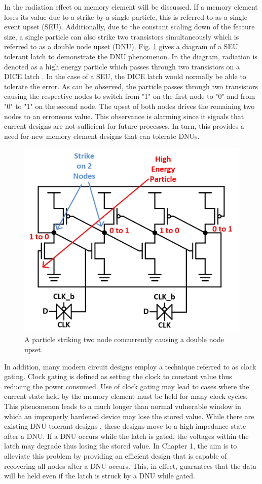In the radiation effect on memory element will be discussed. If a memory element loses its value due to a strike by a single particle, this is referred to as a single event upset (SEU). Additionally, due to the constant scaling down of the feature size, a single particle can also strike two transistors simultaneously which is referred to as a double node upset (DNU). Fig. \ref{DNUStrike} gives a diagram of a SEU tolerant latch to demonstrate the DNU phenomenon. In the diagram, radiation is denoted as a high energy particle which passes through two transistors on a DICE latch \cite{DICE}. In the case of a SEU, the DICE latch would normally be able to tolerate the error. As can be observed, the particle passes through two transistors causing the respective nodes to switch from "1" on the first node to "0" and from "0" to "1" on the second node. The upset of both nodes drives the remaining two nodes to an erroneous value. This observance is alarming since it signals that current designs are not sufficient for future processes. In turn, this provides a need for new memory element designs that can tolerate DNUs. 

\begin{figure}[!htbp]
	\centering
	\includegraphics[width=0.45\linewidth]{Figures/StrikeonDICE}
	\caption{A particle striking two node concurrently causing a double node upset.}
	\label{DNUStrike}
\end{figure} 

In addition, many modern circuit designs employ a technique referred to as clock gating. Clock gating is defined as setting the clock to constant value thus reducing the power consumed. Use of clock gating may lead to cases where the current state held by the memory element must be held for many clock cycles. This phenomenon leads to a much longer than normal vulnerable window in which an improperly hardened device may lose the stored value. While there are existing DNU tolerant designs \cite{Inter,DNCS,HSMUF}, these designs move to a high impedance state after a DNU. If a DNU occurs while the latch is gated, the voltages within the latch may degrade thus losing the stored value. In Chapter 1, the aim is to alleviate this problem by providing an efficient design that is capable of recovering all nodes after a DNU occurs. This, in effect, guarantees that the data will be held even if the latch is struck by a DNU while gated.

